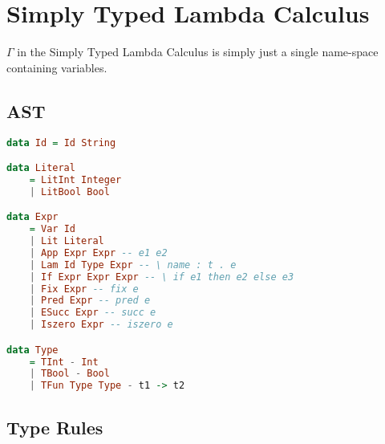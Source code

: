 \section{Simply Typed Lambda Calculus}
$\Gamma$ in the Simply Typed Lambda Calculus is simply just a single name-space containing variables.
\subsection{AST}
\begin{lstlisting}[language=Haskell]
data Id = Id String

data Literal 
    = LitInt Integer
    | LitBool Bool

data Expr 
    = Var Id
    | Lit Literal
    | App Expr Expr -- e1 e2
    | Lam Id Type Expr -- \ name : t . e
    | If Expr Expr Expr -- \ if e1 then e2 else e3
    | Fix Expr -- fix e
    | Pred Expr -- pred e
    | ESucc Expr -- succ e
    | Iszero Expr -- iszero e

data Type
    = TInt - Int
    | TBool - Bool
    | TFun Type Type - t1 -> t2
\end{lstlisting}

\subsection{Type Rules}

